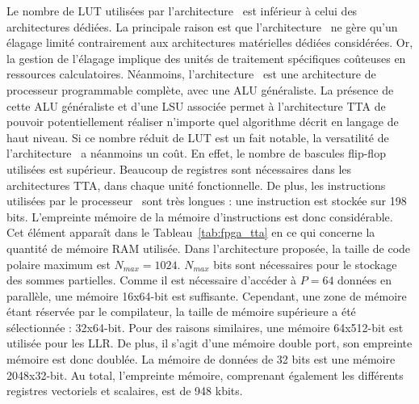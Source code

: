Le nombre de LUT utilisées par l'architecture \TTSC~est inférieur à celui des architectures dédiées. La principale raison est que l'architecture \TTSC~ne gère qu'un élagage limité contrairement aux architectures matérielles dédiées considérées. Or, la gestion de l'élagage implique des unités de traitement spécifiques coûteuses en ressources calculatoires. Néanmoins, l'architecture \TTSC~est une architecture de processeur programmable complète, avec une ALU généraliste. La présence de cette ALU généraliste et d'une LSU associée permet à l'architecture TTA de pouvoir potentiellement réaliser n'importe quel algorithme décrit en langage de haut niveau. Si ce nombre réduit de LUT est un fait notable, la versatilité de l'architecture \TTSC~a néanmoins un coût. En effet, le nombre de bascules flip-flop utilisées est supérieur. Beaucoup de registres sont nécessaires dans les architectures TTA, dans chaque unité fonctionnelle. De plus, les instructions utilisées par le processeur \TTSC~sont très longues : une instruction est stockée sur 198 bits. L'empreinte mémoire de la mémoire d'instructions est donc considérable. Cet élément apparaît dans le Tableau~\ref{tab:fpga_tta} en ce qui concerne la quantité de mémoire RAM utilisée. Dans l'architecture proposée, la taille de code polaire maximum est $N_{max}=1024$. $N_{max}$ bits sont nécessaires pour le stockage des sommes partielles. Comme il est nécessaire d'accéder à $P=64$ données en parallèle, une mémoire 16x64-bit est suffisante. Cependant, une zone de mémoire étant réservée par le compilateur, la taille de mémoire supérieure a été sélectionnée : 32x64-bit. Pour des raisons similaires, une mémoire 64x512-bit est utilisée pour les LLR. De plus, il s'agit d'une mémoire double port, son empreinte mémoire est donc doublée. La mémoire de données de 32 bits est une mémoire 2048x32-bit. Au total, l'empreinte mémoire, comprenant également les différents registres vectoriels et scalaires, est de 948 kbits.




